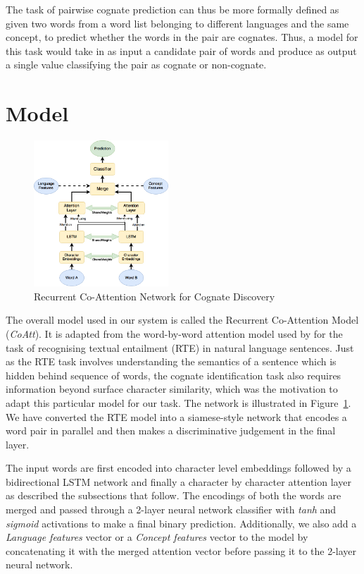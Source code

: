 \documentclass[11pt,letterpaper]{article}
\begin{document}
The task of pairwise cognate prediction can thus be more formally defined as given two words from a word list belonging to different languages and the same concept, to predict whether the words in the pair are cognates. Thus, a model for this task would take in as input a candidate pair of words and produce as output a single value classifying the pair as cognate or non-cognate. 

\section{Model}

\begin{figure}[t]
	\centering
	\includegraphics[width=0.45\textwidth]{CoAttNetwork}
    \caption{Recurrent Co-Attention Network for Cognate Discovery}
    \label{CoAttNet}
\end{figure}

The overall model used in our system is called the Recurrent Co-Attention Model (\textit{CoAtt}). It is adapted from the word-by-word attention model used by \cite{rocktaschel2016reasoning} for the task of recognising textual entailment (RTE) in natural language sentences. Just as the RTE task involves understanding the semantics of a sentence which is hidden behind sequence of words, the cognate identification task also requires information beyond surface character similarity, which was the motivation to adapt this particular model for our task. The network is illustrated in Figure~\ref{CoAttNet}. We have converted the RTE model into a siamese-style network that encodes a word pair in parallel and then makes a discriminative judgement in the final layer. 

The input words are first encoded into character level embeddings followed by a bidirectional LSTM network and finally a character by character attention layer as described the subsections that follow. The encodings of both the words are merged and passed through a 2-layer neural network classifier with \textit{tanh} and \textit{sigmoid} activations to make a final binary prediction. Additionally, we also add a \textit{Language features} vector or a \textit{Concept features} vector to the model by concatenating it with the merged attention vector before passing it to the 2-layer neural network.
\end{document}
